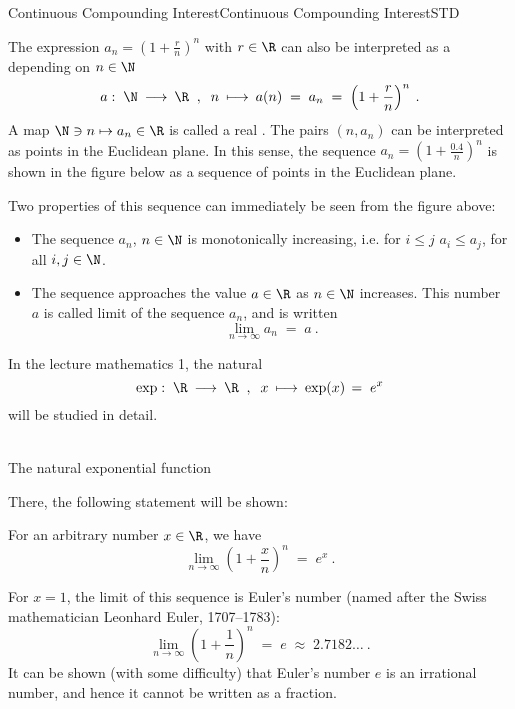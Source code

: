 \begin{MXContent}{Continuous Compounding Interest}{Continuous Compounding Interest}{STD}

The expression $a_{n}=\left({1+\frac{r}{n}}\right)^{n}$ with $r\in\R$ can also be interpreted 
as a  depending on $n\in\N$
$$
a:\; \N\:\longrightarrow\: \R\;\; , \;\;  n\:\longmapsto\: a(n)\; =\; a_{n}\; =\;\left({ 1+\frac{r}{n}}\right)^{n}\: .
$$
A map $\N \ni n \mapsto a_{n}\in \R$ is called a real . The pairs $(n,a_{n})$ 
can be interpreted as points in the Euclidean plane. In this sense, the sequence $a_{n}=\left({1+\frac{0.4}{n}} \right)^{n}$ 
is shown in the figure below as a sequence of points in the Euclidean plane.

\begin{center}
\end{center}

Two properties of this sequence can immediately be seen from the figure above:
\begin{itemize}
\item{The sequence $a_{n}$, $n\in \N$ is monotonically increasing, i.e. for $i\leq j$ $a_i\leq a_j$, for all $i,j\in \N$.}
\item{The sequence approaches the value $a\in \R$ as $n\in \N$ increases. This number $a$ is called limit of the sequence 
$a_{n}$, and is written
$$
\lim\limits_{n\rightarrow \infty} a_{n}\; =\;a\: .
$$}
\end{itemize}
In the lecture mathematics 1, the natural 
$$
\exp:\;\R\:\longrightarrow\: \R\;\; , \;\; x\:\longmapsto\: \exp(x)\,=\; e^x
$$
will be studied in detail.


\begin{center}
\\
The natural exponential function
\end{center}

There, the following statement will be shown:

\begin{MInfo}
For an arbitrary number $x\in \R$, we have
$$
\lim\limits_{n\rightarrow \infty}\left({1 + \frac{x}{n}} \right)^{n}\; =\; e^{x}\: .
$$
\end{MInfo}

For $x=1$, the limit of this sequence is Euler's number (named after the Swiss mathematician Leonhard Euler, 1707--1783):
$$
\lim\limits_{n\rightarrow \infty}\left({1 + \frac{1}{n}} \right)^{n}\; =\; e\;  \approx \; 2.7182\ldots \: .
$$
It can be shown (with some difficulty) that Euler's number $e$ is an irrational number, and hence it cannot be written as a fraction.


\end{MXContent}

